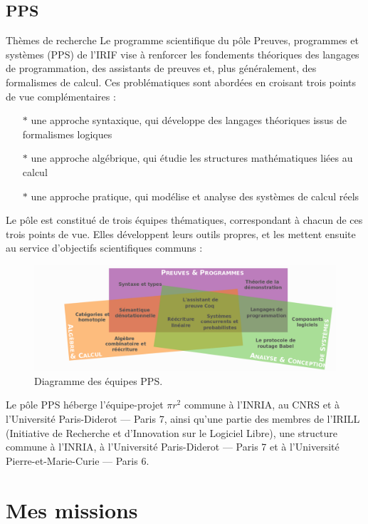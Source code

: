 \documentclass{article}
\begin{document}
\subsection{PPS}

Thèmes de recherche
\newline\newline
Le programme scientifique du pôle Preuves, programmes et systèmes (PPS) de l'IRIF vise à renforcer les fondements théoriques des langages de programmation, des assistants de preuves et, plus généralement, des formalismes de calcul. Ces problématiques sont abordées en croisant trois points de vue complémentaires :
\begin{itemize}	
	\item[$\ast$]une approche syntaxique, qui développe des langages théoriques issus de formalismes logiques
    \item[$\ast$]une approche algébrique, qui étudie les structures mathématiques liées au calcul
	\item[$\ast$]une approche pratique, qui modélise et analyse des systèmes de calcul réels
\end{itemize}
Le pôle est constitué de trois équipes thématiques, correspondant à chacun de ces trois points de vue. Elles développent leurs outils propres, et les mettent ensuite au service d'objectifs scientifiques communs :
\begin{figure}[h!]
	\includegraphics[width=\linewidth]{PPS.png}
	\caption{Diagramme des équipes PPS.}
\end{figure}
\newline
Le pôle PPS héberge l'équipe-projet \begin{math}\pi r^2\end{math} commune à l'INRIA, au CNRS et à l'Université Paris-Diderot — Paris 7, ainsi qu'une partie des membres de l'IRILL (Initiative de Recherche et d'Innovation sur le Logiciel Libre), une structure commune à l'INRIA, à l'Université Paris-Diderot — Paris 7 et à l'Université Pierre-et-Marie-Curie — Paris 6. 
\newpage
\section{Mes missions}
\end{document}
